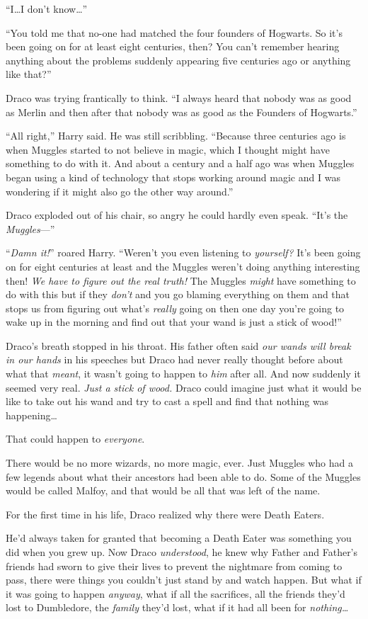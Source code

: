 “I…I don’t know…”

“You told me that no-one had matched the four founders of Hogwarts. So it’s been going on for at least eight centuries, then? You can’t remember hearing anything about the problems suddenly appearing five centuries ago or anything like that?”

Draco was trying frantically to think. “I always heard that nobody was as good as Merlin and then after that nobody was as good as the Founders of Hogwarts.”

“All right,” Harry said. He was still scribbling. “Because three centuries ago is when Muggles started to not believe in magic, which I thought might have something to do with it. And about a century and a half ago was when Muggles began using a kind of technology that stops working around magic and I was wondering if it might also go the other way around.”

Draco exploded out of his chair, so angry he could hardly even speak. “It’s the \emph{Muggles}—”

“\emph{Damn it!}” roared Harry. “Weren’t you even listening to \emph{yourself?} It’s been going on for eight centuries at least and the Muggles weren’t doing anything interesting then! \emph{We have to figure out the real truth!} The Muggles \emph{might} have something to do with this but if they \emph{don’t} and you go blaming everything on them and that stops us from figuring out what’s \emph{really} going on then one day you’re going to wake up in the morning and find out that your wand is just a stick of wood!”

Draco’s breath stopped in his throat. His father often said \emph{our wands will break in our hands} in his speeches but Draco had never really thought before about what that \emph{meant}, it wasn’t going to happen to \emph{him} after all. And now suddenly it seemed very real. \emph{Just a stick of wood.} Draco could imagine just what it would be like to take out his wand and try to cast a spell and find that nothing was happening…

That could happen to \emph{everyone}.

There would be no more wizards, no more magic, ever. Just Muggles who had a few legends about what their ancestors had been able to do. Some of the Muggles would be called Malfoy, and that would be all that was left of the name.

For the first time in his life, Draco realized why there were Death Eaters.

He’d always taken for granted that becoming a Death Eater was something you did when you grew up. Now Draco \emph{understood}, he knew why Father and Father’s friends had sworn to give their lives to prevent the nightmare from coming to pass, there were things you couldn’t just stand by and watch happen. But what if it was going to happen \emph{anyway}, what if all the sacrifices, all the friends they’d lost to Dumbledore, the \emph{family} they’d lost, what if it had all been for \emph{nothing…}

